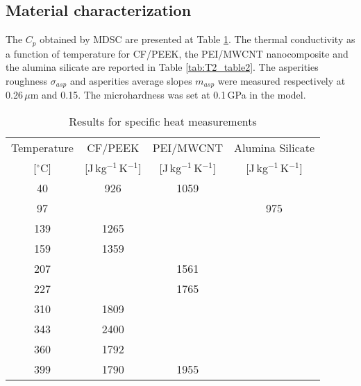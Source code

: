 \subsection{Material characterization}

The $C_p$ obtained by MDSC are presented at Table \ref{tab:T2_table1}. 
The thermal conductivity as a function of temperature for CF/PEEK, the PEI/MWCNT nanocomposite and the alumina silicate are reported in Table \ref{tab:T2_table2}. 
The asperities roughness $\sigma_{asp}$ and asperities average slopes $m_{asp}$ were measured respectively at \mbox{0.26\,$\mu$m} and 0.15. 
The microhardness was set at \mbox{0.1\,GPa} in the model. 

\begin{table}[ht]
	\centering
	\caption{Results for specific heat measurements}
	\begin{tabular}{@{}cccc@{}}
		\toprule
		   Temperature    &           CF/PEEK            &          PEI/MWCNT           &       Alumina Silicate       \\
		{[}$^{\circ}$C{]} & {[}J\,kg$^{-1}$\,K$^{-1}${]} & {[}J\,kg$^{-1}$\,K$^{-1}${]} & {[}J\,kg$^{-1}$\,K$^{-1}${]} \\ \midrule
		       40         &             926              &             1059             &                              \\
		       97         &                              &                              &             975              \\
		       139        &             1265             &                              &                              \\
		       159        &             1359             &                              &                              \\
		       207        &                              &             1561             &                              \\
		       227        &                              &             1765             &                              \\
		       310        &             1809             &                              &                              \\
		       343        &             2400             &                              &                              \\
		       360        &             1792             &                              &                              \\
		       399        &             1790             &             1955             &                              \\ \bottomrule
	\end{tabular}
	\label{tab:T2_table1}
\end{table}

